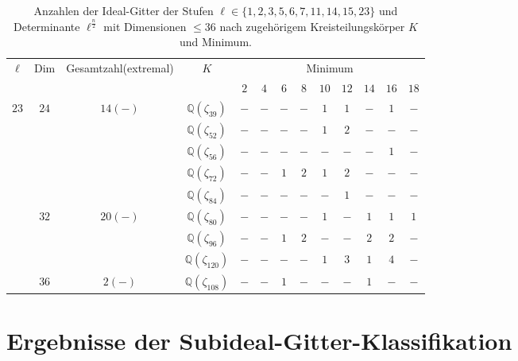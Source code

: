 \documentclass[12pt,a4paper,halfparskip,headsepline,bibtotocnumbered]{scrreprt}
\theoremstyle{nummermitklammern}
\theoremstyle{nonumberbreak}
\newcommand{\Q}{\mathbb{Q}}
\begin{document}
\begin{table}
	\centering
	\begin{tabular}{|c|c|c|c|c|c|c|c|c|c|c|c|c|}
		\hline		
		\multirow{2}{*}{$\ell$}	&\multirow{2}{*}{Dim}	&\multirow{2}{*}{Gesamtzahl(extremal)}	&\multirow{2}{*}{$K$}	&\multicolumn{9}{c|}{Minimum}\\ \cline{5-13}
								&						&							&					&$2$	&$4$	&$6$	&$8$	&$10$	&$12$	&$14$	&$16$	&$18$\\ \hline
		\multirow{9}{*}{$23$}	&\multirow{5}{*}{$24$}	&\multirow{5}{*}{$14(-)$}	&$\Q(\zeta_{39})$	&$-$	&$-$	&$-$	&$-$	&$1$	&$1$	&$-$	&$1$	&$-$\\ \cline{4-13}
								&						&							&$\Q(\zeta_{52})$	&$-$	&$-$	&$-$	&$-$	&$1$	&$2$	&$-$	&$-$	&$-$\\ \cline{4-13}
								&						&							&$\Q(\zeta_{56})$	&$-$	&$-$	&$-$	&$-$	&$-$	&$-$	&$-$	&$1$	&$-$\\ \cline{4-13}
								&						&							&$\Q(\zeta_{72})$	&$-$	&$-$	&$1$	&$2$	&$1$	&$2$	&$-$	&$-$	&$-$\\ \cline{4-13}
								&						&							&$\Q(\zeta_{84})$	&$-$	&$-$	&$-$	&$-$	&$-$	&$1$	&$-$	&$-$	&$-$\\ \cline{2-13}
								&\multirow{3}{*}{$32$}	&\multirow{3}{*}{$20(-)$}	&$\Q(\zeta_{80})$	&$-$	&$-$	&$-$	&$-$	&$1$	&$-$	&$1$	&$1$	&$1$\\ \cline{4-13}
								&						&							&$\Q(\zeta_{96})$	&$-$	&$-$	&$1$	&$2$	&$-$	&$-$	&$2$	&$2$	&$-$\\ \cline{4-13}
								&						&							&$\Q(\zeta_{120})$	&$-$	&$-$	&$-$	&$-$	&$1$	&$3$	&$1$	&$4$	&$-$\\ \cline{2-13}
								&$36$					&$2(-)$						&$\Q(\zeta_{108})$	&$-$	&$-$	&$1$	&$-$	&$-$	&$-$	&$1$	&$-$	&$-$\\ \hline
	\end{tabular}
	\caption{Anzahlen der Ideal-Gitter der Stufen $\ell \in \lbrace 1,2,3,5,6,7,11,14,15,23 \rbrace$ und Determinante $\ell^\frac{n}{2}$ mit Dimensionen $\leq 36$ nach zugehörigem Kreisteilungskörper $K$ und Minimum.}
\end{table}

\section{Ergebnisse der Subideal-Gitter-Klassifikation}
\end{document}
